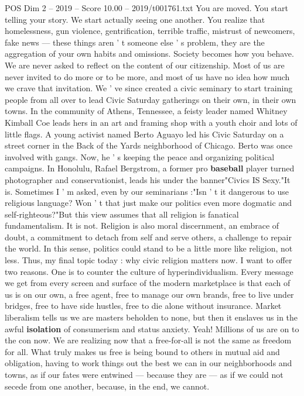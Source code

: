 \begin{textsample}{POS Dim 2 – 2019 – Score 10.00 – 2019/t001761.txt}
You are moved.
You start telling your story.
We start actually seeing one another.
You realize that homelessness, gun violence, gentrification, terrible traffic, mistrust of newcomers, fake news — these things aren ' t someone else ' s problem, they are the aggregation of your own habits and omissions.
Society becomes how you behave.
We are never asked to reflect on the content of our citizenship.
Most of us are never invited to do more or to be more, and most of us have no idea how much we crave that invitation.
We ' ve since created a civic seminary to start training people from all over to lead Civic Saturday gatherings on their own, in their own towns.
In the community of Athens, Tennessee, a feisty leader named Whitney Kimball Coe leads hers in an art and framing shop with a youth choir and lots of little flags.
A young activist named Berto Aguayo led his Civic Saturday on a street corner in the Back of the Yards neighborhood of Chicago.
Berto was once involved with gangs.
Now, he ' s keeping the peace and organizing political campaigns.
In Honolulu, Rafael Bergstrom, a former pro \textbf{baseball} player turned photographer and conservationist, leads his under the banner"Civics IS Sexy."It is.
Sometimes I ' m asked, even by our seminarians :"Isn ' t it dangerous to use religious language?
Won ' t that just make our politics even more dogmatic and self-righteous?"But this view assumes that all religion is fanatical fundamentalism.
It is not.
Religion is also moral discernment, an embrace of doubt, a commitment to detach from self and serve others, a challenge to repair the world.
In this sense, politics could stand to be a little more like religion, not less.
Thus, my final topic today : why civic religion matters now.
I want to offer two reasons.
One is to counter the culture of hyperindividualism.
Every message we get from every screen and surface of the modern marketplace is that each of us is on our own, a free agent, free to manage our own brands, free to live under bridges, free to have side hustles, free to die alone without insurance.
Market liberalism tells us we are masters beholden to none, but then it enslaves us in the awful \textbf{isolation} of consumerism and status anxiety.
Yeah!
Millions of us are on to the con now.
We are realizing now that a free-for-all is not the same as freedom for all.
What truly makes us free is being bound to others in mutual aid and obligation, having to work things out the best we can in our neighborhoods and towns, as if our fates were entwined — because they are — as if we could not secede from one another, because, in the end, we cannot.

\end{textsample}
